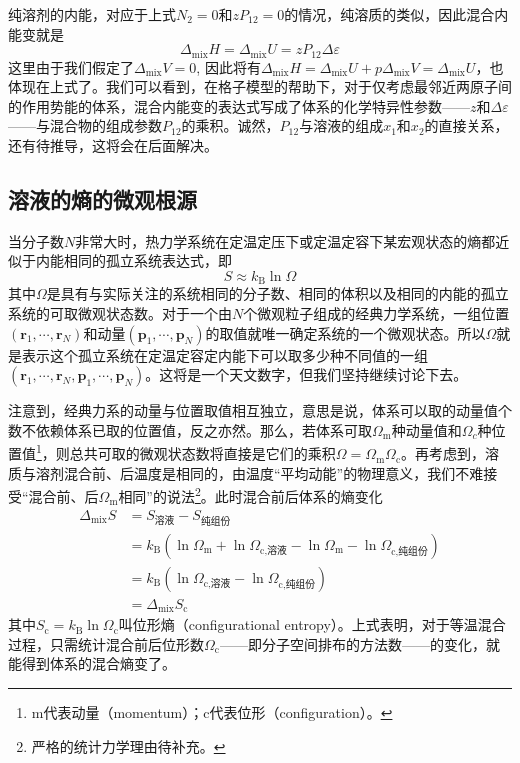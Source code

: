 \documentclass[main.tex]{subfiles}
\begin{document}
纯溶剂的内能，对应于上式$N_2=0$和$zP_{12}=0$的情况，纯溶质的类似，因此混合内能变就是
\begin{equation}\label{eq:III.1_mixing_internal_energy_regular_solution}
    \Delta_\text{mix}H=\Delta_\text{mix}U=zP_{12}\Delta\varepsilon
\end{equation}
这里由于我们假定了$\Delta_\text{mix} V=0$, 因此将有$\Delta_\text{mix}H=\Delta_\text{mix}U+p\Delta_\text{mix}V=\Delta_\text{mix}U$，也体现在上式了。我们可以看到，在格子模型的帮助下，对于仅考虑最邻近两原子间的作用势能的体系，混合内能变的表达式写成了体系的化学特异性参数——$z$和$\Delta\varepsilon$——与混合物的组成参数$P_{12}$的乘积。诚然，$P_{12}$与溶液的组成$x_1$和$x_2$的直接关系，还有待推导，这将会在后面解决。

\subsection{溶液的熵的微观根源}
当分子数$N$非常大时，热力学系统在定温定压下或定温定容下某宏观状态的熵都近似于内能相同的孤立系统表达式，即
\[S\approx k_\text{B}\ln\Omega\]
其中$\Omega$是具有与实际关注的系统相同的分子数、相同的体积以及相同的内能的孤立系统的可取微观状态数。对于一个由$N$个微观粒子组成的经典力学系统，一组位置$\left(\mathbf{r}_1,\cdots,\mathbf{r}_N\right)$和动量$\left(\mathbf{p}_1,\cdots,\mathbf{p}_N\right)$的取值就唯一确定系统的一个微观状态。所以$\Omega$就是表示这个孤立系统在定温定容定内能下可以取多少种不同值的一组$\left(\mathbf{r}_1,\cdots,\mathbf{r}_N,\mathbf{p}_1,\cdots,\mathbf{p}_N\right)$。这将是一个天文数字，但我们坚持继续讨论下去。

注意到，经典力系的动量与位置取值相互独立，意思是说，体系可以取的动量值个数不依赖体系已取的位置值，反之亦然。那么，若体系可取$\Omega_\text{m}$种动量值和$\Omega_c$种位置值\footnote{m代表动量（momentum）；c代表位形（configuration）。}，则总共可取的微观状态数将直接是它们的乘积$\Omega=\Omega_\text{m}\Omega_\text{c}$。再考虑到，溶质与溶剂混合前、后温度是相同的，由温度“平均动能”的物理意义，我们不难接受“混合前、后$\Omega_\text{m}$相同”的说法\footnote{严格的统计力学理由待补充。}。此时混合前后体系的熵变化
\[\begin{aligned}\Delta_\text{mix}S & =S_\text{溶液}-S_\text{纯组份}                                                                                  \\
                                  & =k_\text{B}\left(\ln\Omega_\text{m}+\ln\Omega_\text{c,溶液}-\ln\Omega_\text{m}-\ln\Omega_\text{c,纯组份}\right) \\
                                  & =k_\text{B}\left(\ln\Omega_\text{c,溶液}-\ln\Omega_\text{c,纯组份}\right)                                       \\
                                  & =\Delta_\text{mix}S_\text{c}\end{aligned}\]
其中$S_\text{c}=k_\text{B}\ln\Omega_\text{c}$叫位形熵（configurational entropy）。上式表明，对于等温混合过程，只需统计混合前后位形数$\Omega_\text{c}$——即分子空间排布的方法数——的变化，就能得到体系的混合熵变了。
\end{document}
